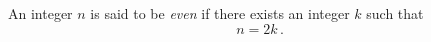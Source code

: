 \guard


\begin{defn}
\label{defn:even}
  An integer $n$ is said to be \emph{even} if there exists an integer $k$ such that \[ n = 2 k \,.\]
\end{defn}
